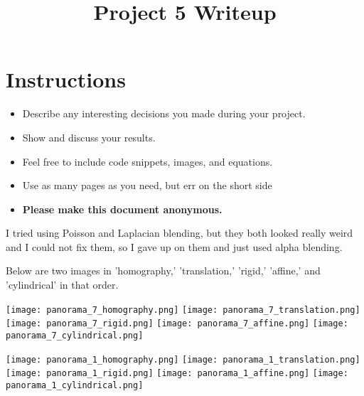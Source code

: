 \documentclass[11pt]{article}
\date{}
\title{\vspace{-1cm}Project 5 Writeup}
\begin{document}
\maketitle
\vspace{-3cm}
\thispagestyle{fancy}

\section*{Instructions}
\begin{itemize}
  \item Describe any interesting decisions you made during your project.
  \item Show and discuss your results.
  \item Feel free to include code snippets, images, and equations.
  \item Use as many pages as you need, but err on the short side 
  \item \textbf{Please make this document anonymous.}
\end{itemize}

I tried using Poisson and Laplacian blending, but they both looked really weird and I could not fix them, so I gave up on them and just used alpha blending.

Below are two images in 'homography,' 'translation,' 'rigid,' 'affine,' and 'cylindrical' in that order.

\texttt{[image: panorama\_7\_homography.png]}
\texttt{[image: panorama\_7\_translation.png]}
\texttt{[image: panorama\_7\_rigid.png]}
\texttt{[image: panorama\_7\_affine.png]}
\texttt{[image: panorama\_7\_cylindrical.png]}

\texttt{[image: panorama\_1\_homography.png]}
\texttt{[image: panorama\_1\_translation.png]}
\texttt{[image: panorama\_1\_rigid.png]}
\texttt{[image: panorama\_1\_affine.png]}
\texttt{[image: panorama\_1\_cylindrical.png]}
\end{document}

